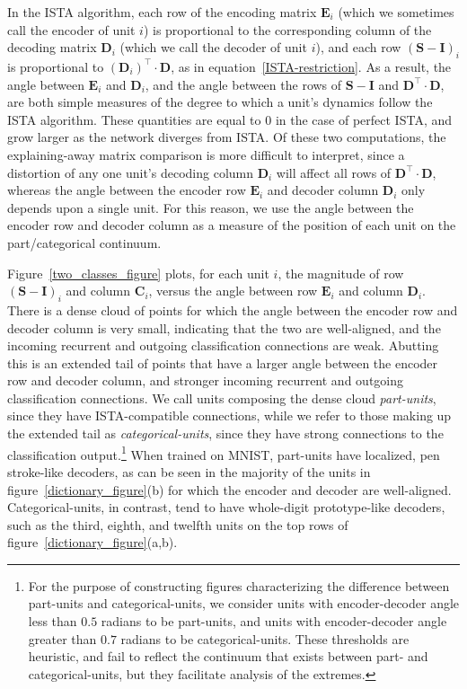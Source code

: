 \documentclass{article} %
\newcommand{\C}{\mathbf{C}}
\newcommand{\D}{\mathbf{D}}
\newcommand{\E}{\mathbf{E}}
\newcommand{\I}{\mathbf{I}}
\newcommand{\Sm}{\mathbf{S}}
\begin{document}
In the ISTA algorithm, each row of the encoding matrix $\E_i$ (which we sometimes call the encoder of unit $i$) is proportional to the corresponding column of the decoding matrix $\D_i$ (which we call the decoder of unit $i$), and each row $\left( \Sm - \I \right)_i$ is proportional to $\left( \D_i \right)^\top \cdot \D$, as in equation~\ref{ISTA-restriction}.  As a result, the angle between $\E_i$ and $\D_i$, and the angle between the rows of $\Sm - \I$ and $\D^{\top} \cdot \D$, are both simple measures of the degree to which a unit's dynamics follow the ISTA algorithm.  These quantities are equal to $0$ in the case of perfect ISTA, and grow larger as the network diverges from ISTA.
Of these two computations, the explaining-away matrix comparison is more difficult to interpret, since a distortion of any one unit's decoding column $\D_i$ will affect all rows of $\D^{\top} \cdot \D$, whereas the angle between the encoder row $\E_i$ and decoder column $\D_i$ only depends upon a single unit. For this reason, we use the angle between the encoder row and decoder column as a measure of the position of each unit on the part/categorical continuum.  %

Figure~\ref{two_classes_figure} plots, for each unit $i$, the magnitude of row $\left( \Sm - \I \right)_i$ and column $\C_i$, versus the angle between row $\E_i$ and column $\D_i$.
There is a dense cloud of points for which the angle between the encoder row and decoder column is very small, indicating that the two are well-aligned, and the incoming recurrent and outgoing classification connections are weak.  Abutting this is an extended tail of points that have a larger angle between the encoder row and decoder column, and stronger incoming recurrent and outgoing classification connections.  We call units composing the dense cloud \emph{part-units}, since they have ISTA-compatible connections, while we refer to those making up the extended tail as \emph{categorical-units}, since they have strong connections to the classification output.\footnote{For the purpose of constructing figures characterizing the difference between part-units and categorical-units, we consider units with encoder-decoder angle less than $0.5$ radians to be part-units, and units with encoder-decoder angle greater than $0.7$ radians to be categorical-units.  These thresholds are heuristic, and fail to reflect the continuum that exists between part- and categorical-units, but they facilitate analysis of the extremes.}  When trained on MNIST, part-units have localized, pen stroke-like decoders, as can be seen in the majority of the units in figure~\ref{dictionary_figure}(b) for which the encoder and decoder are well-aligned.  Categorical-units, in contrast, tend to have whole-digit prototype-like decoders, such as the third, eighth, and twelfth units on the top rows of figure~\ref{dictionary_figure}(a,b).
\end{document}
